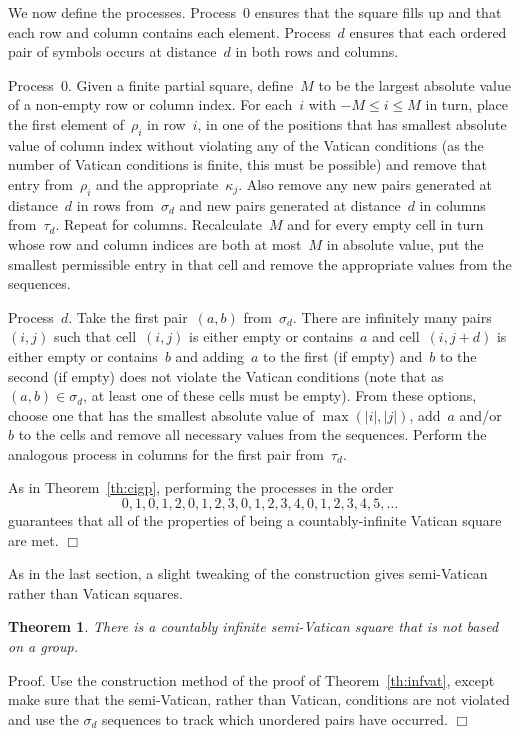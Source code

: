 \documentclass[12pt,a4paper]{article}
\newtheorem{thm}{Theorem}
\newcommand{\qed}{\unskip\protect\nolinebreak\mbox{\quad$\Box$}\vspace{3mm}}
\begin{document}
We now define the processes.  Process~0 ensures that the square fills up and that each row and column contains each element.  Process~$d$ ensures that each ordered pair of symbols occurs at distance~$d$ in both rows and columns.

Process~$0$. Given a finite partial square, define~$M$ to be the largest absolute value of a non-empty row or column index.  For each~$i$ with $-M \leq i \leq M$ in turn, place the first element of~$\rho_i$ in row~$i$, in one of the positions that has smallest absolute value of column index without violating any of the Vatican conditions (as the number of Vatican conditions is finite, this must be possible) and remove that entry from~$\rho_i$ and the appropriate~$\kappa_j$.  Also remove any new pairs generated at distance~$d$ in rows from~$\sigma_d$ and new pairs generated at distance~$d$ in columns from~$\tau_d$.
Repeat for columns.  Recalculate~$M$ and for every empty cell in turn whose row and column indices are both at most~$M$ in absolute value, put the smallest permissible entry in that cell and remove the appropriate values from the sequences.

Process~$d$.  Take the first pair~$(a,b)$ from~$\sigma_d$.  There are infinitely many pairs~$(i,j)$ such that cell~$(i,j)$ is either empty or contains~$a$ and cell~$(i,j+d)$ is either empty or contains~$b$  and adding~$a$ to the first (if empty) and~$b$ to the second (if empty) does not violate the Vatican conditions (note that as $(a,b) \in \sigma_d$, at least one of these cells  must be empty).  From these options, choose one that has the smallest absolute value of $\max(|i|,|j|)$, add~$a$ and/or~$b$ to the cells and remove all necessary values from the sequences.  Perform the analogous process in columns for the first pair from~$\tau_d$.

As in Theorem~\ref{th:cigp}, performing the processes in the order
$$0,1,0,1,2,0,1,2,3,0,1,2,3,4,0,1,2,3,4,5,\ldots$$
guarantees that all of the properties of being a countably-infinite Vatican square are met.
\qed

As in the last section, a slight tweaking of the construction gives semi-Vatican rather than Vatican squares.

\begin{thm} \label{th:infsv}
There is a countably infinite semi-Vatican square that is not based on a  group.
\end{thm}

\noindent
Proof.  Use the construction method of the proof of Theorem~\ref{th:infvat}, except make sure that the semi-Vatican, rather than Vatican, conditions are not violated and use the $\sigma_d$ sequences to track which unordered pairs have occurred.
\qed
\end{document}
